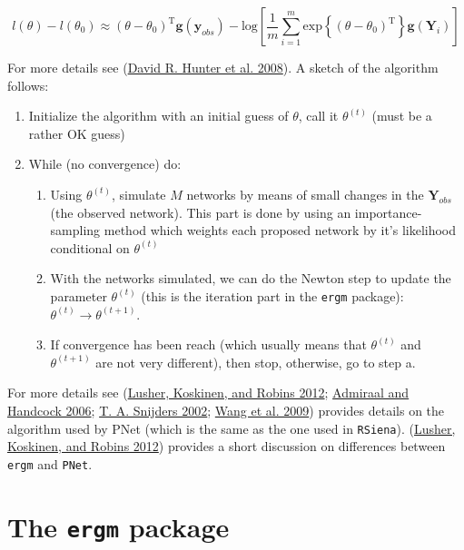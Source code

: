 \documentclass[
]{book}
\begin{document}
\[
l(\theta) - l(\theta_0) \approx (\theta - \theta_0)^{\mbox{T}}\mathbf{g}(\mathbf{y}_{obs}) - 
\mbox{log}{\left[\frac{1}{m}\sum_{i = 1}^m\mbox{exp}\left\{(\theta-\theta_0)^{\mbox{T}}\right\}\mathbf{g}(\mathbf{Y}_i)\right]}
\]

For more details see (\protect\hyperlink{ref-Hunter2008}{David R. Hunter et al. 2008}). A sketch of the algorithm follows:

\begin{enumerate}
\def\labelenumi{\arabic{enumi}.}
\item
  Initialize the algorithm with an initial guess of \(\theta\), call it \(\theta^{(t)}\) (must be a rather OK guess)
\item
  While (no convergence) do:

  \begin{enumerate}
  \def\labelenumii{\alph{enumii}.}
  \item
    Using \(\theta^{(t)}\), simulate \(M\) networks by means of small changes in the \(\mathbf{Y}_{obs}\) (the observed network). This part is done by using an importance-sampling method which weights each proposed network by it's likelihood conditional on \(\theta^{(t)}\)
  \item
    With the networks simulated, we can do the Newton step to update the parameter \(\theta^{(t)}\) (this is the iteration part in the \texttt{ergm} package): \(\theta^{(t)}\to\theta^{(t+1)}\).
  \item
    If convergence has been reach (which usually means that \(\theta^{(t)}\) and \(\theta^{(t + 1)}\) are not very different), then stop, otherwise, go to step a.
  \end{enumerate}
\end{enumerate}

For more details see (\protect\hyperlink{ref-lusher2012}{Lusher, Koskinen, and Robins 2012}; \protect\hyperlink{ref-admiraal2006}{Admiraal and Handcock 2006}; \protect\hyperlink{ref-Snijders2002}{T. A. Snijders 2002}; \protect\hyperlink{ref-Wang2009}{Wang et al. 2009}) provides details on the algorithm used by PNet (which is the same as the one used in \texttt{RSiena}). (\protect\hyperlink{ref-lusher2012}{Lusher, Koskinen, and Robins 2012}) provides a short discussion on differences between \texttt{ergm} and \texttt{PNet}.

\hypertarget{the-ergm-package}{%
\section{\texorpdfstring{The \texttt{ergm} package}{The ergm package}}\label{the-ergm-package}}
\end{document}
